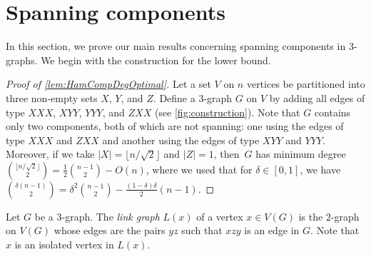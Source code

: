 \documentclass[12pt,reqno]{amsart}
\theoremstyle{plain}
\theoremstyle{definition}
\numberwithin{equation}{section}
\begin{document}
    
	\section{Spanning components}\label{s:HamComp}
	
	In this section, we prove our main results concerning spanning components in $3$-graphs.
	We begin with the construction for the lower bound.
	
	\begin{proof}[Proof of \cref{lem:HamCompDegOptimal}]
		Let a set $V$ on $n$ vertices be partitioned into three non-empty sets $X$, $Y$, and $Z$.
		Define a $3$-graph $G$ on $V$ by adding all edges of type $XXX$, $XYY$, $YYY$, and $ZXX$ (see \cref{fig:construction}).
		Note that $G$ contains only two components, both of which are not spanning: one using the edges of type $XXX$ and $ZXX$ and another using the edges of type $XYY$ and $YYY$.
		Moreover, if we take $|X| = \lfloor n/\sqrt{2} \rfloor$ and $|Z|=1$, then~$G$ has minimum degree $\binom{\lfloor n/\sqrt{2} \rfloor}{2} = \tfrac{1}{2} \binom{n-1}{2} - O(n)$,
		where we used that for $\delta\in[0,1]$, we have $\binom{\delta (n-1) }{2}=\delta^2\binom{n-1}{2}-\frac{(1-\delta)\delta}{2}(n-1)$.
	\end{proof}
	
	Let $G$ be a $3$-graph.
	The \emph{link graph} $L(x)$ of a vertex $x \in V(G)$ is the $2$-graph on $V(G)$ whose edges are the pairs $yz$ such that $xzy$ is an edge in $G$. Note that $x$ is an isolated vertex in $L(x)$.
	
\end{document}

